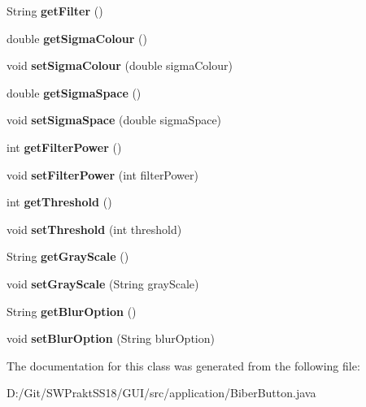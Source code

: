 \begin{DoxyCompactItemize}
String {\bfseries get\+Filter} ()
\item 
\mbox{\label{classapplication_1_1_biber_button_a4317939d3ca919a7f7189dc5bdea03cf}} 
double {\bfseries get\+Sigma\+Colour} ()
\item 
\mbox{\label{classapplication_1_1_biber_button_ac4adc3b492e83e267f9c556de0d5c43a}} 
void {\bfseries set\+Sigma\+Colour} (double sigma\+Colour)
\item 
\mbox{\label{classapplication_1_1_biber_button_af64a5fa6d9b36a2a2faced65b6a4a710}} 
double {\bfseries get\+Sigma\+Space} ()
\item 
\mbox{\label{classapplication_1_1_biber_button_adae5a2d9eb92bb9d86929457df1ca6b4}} 
void {\bfseries set\+Sigma\+Space} (double sigma\+Space)
\item 
\mbox{\label{classapplication_1_1_biber_button_a5eea796b0588c567279affb5593a1180}} 
int {\bfseries get\+Filter\+Power} ()
\item 
\mbox{\label{classapplication_1_1_biber_button_a58af78d91db0cd631dd8aa9e5e000ee7}} 
void {\bfseries set\+Filter\+Power} (int filter\+Power)
\item 
\mbox{\label{classapplication_1_1_biber_button_a081afa6673205c6b81ad42c2a58718eb}} 
int {\bfseries get\+Threshold} ()
\item 
\mbox{\label{classapplication_1_1_biber_button_aff5aea5ee97e07212a3e5b33777fe808}} 
void {\bfseries set\+Threshold} (int threshold)
\item 
\mbox{\label{classapplication_1_1_biber_button_aac0cdaad5615f7cafd117d4e284fd444}} 
String {\bfseries get\+Gray\+Scale} ()
\item 
\mbox{\label{classapplication_1_1_biber_button_a3ed1118f058432a815ffa69de4a1468f}} 
void {\bfseries set\+Gray\+Scale} (String gray\+Scale)
\item 
\mbox{\label{classapplication_1_1_biber_button_aec45af68b6bfebb8dede172a6d98767c}} 
String {\bfseries get\+Blur\+Option} ()
\item 
\mbox{\label{classapplication_1_1_biber_button_a877055537fd74aba171cec25240cd92d}} 
void {\bfseries set\+Blur\+Option} (String blur\+Option)
\end{DoxyCompactItemize}


The documentation for this class was generated from the following file\+:\begin{DoxyCompactItemize}
\item 
D\+:/\+Git/\+S\+W\+Prakt\+S\+S18/\+G\+U\+I/src/application/Biber\+Button.\+java\end{DoxyCompactItemize}
